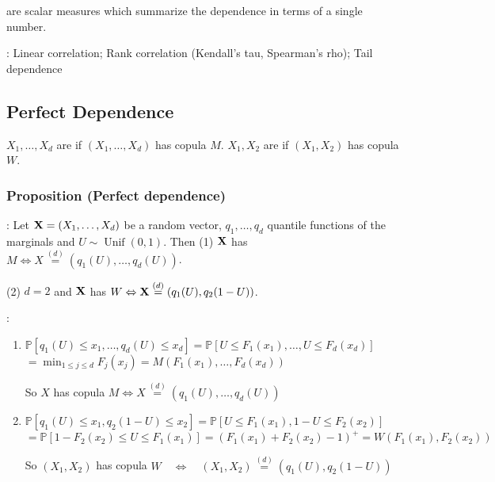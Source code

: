 
 are scalar measures which summarize the dependence in terms of a single number.

: Linear correlation; Rank correlation (Kendall’s tau, Spearman’s rho); Tail dependence


\subsection*{Perfect Dependence}
$X_{1}, \ldots, X_{d}$ are  if $\left(X_{1}, \ldots, X_{d}\right)$ has copula $M$. $X_{1}, X_{2}$ are  if $\left(X_{1}, X_{2}\right)$ has copula $W$.

\subsubsection*{Proposition (Perfect dependence)}: Let $\operatorname{\boldsymbol{\mathbf{X}}}=\left(X_{1}, \ldots, X_{d}\right)$ be a random vector, $q_{1}, \ldots, q_{d}$ quantile functions of the marginals and $U \sim \operatorname{Unif}(0,1)$. Then
(1) $\operatorname{\boldsymbol{\mathbf{X}}}$ has  $M \Leftrightarrow X \stackrel{(d)}{=}\left(q_{1}(U), \ldots, q_{d}(U)\right)$.


(2) $d=2$ and $\operatorname{\boldsymbol{\mathbf{X}}}$ has  $W \Leftrightarrow \operatorname{\boldsymbol{\mathbf{X}}} \stackrel{(d)}{=}\left(q_{1}(U), q_{2}(1-U)\right)$.

: 
\begin{enumerate}[label = (\arabic*), leftmargin=*]
    \item $\mathbb{P}\left[q_{1}(U) \leq x_{1}, \ldots, q_{d}(U) \leq x_{d}\right]=\mathbb{P}\left[U \leq F_{1}\left(x_{1}\right), \ldots, U \leq F_{d}\left(x_{d}\right)\right]$
$=\min _{1 \leq j \leq d} F_{j}\left(x_{j}\right)=M\left(F_{1}\left(x_{1}\right), \ldots, F_{d}\left(x_{d}\right)\right)$

So $X$ has copula $M \Leftrightarrow X \stackrel{(d)}{=}\left(q_{1}(U), \ldots, q_{d}(U)\right)$
    \item $\mathbb{P}\left[q_{1}(U) \leq x_{1}, q_{2}(1-U) \leq x_{2}\right]=\mathbb{P}\left[U \leq F_{1}\left(x_{1}\right), 1-U \leq F_{2}\left(x_{2}\right)\right]$
$=\mathbb{P}\left[1-F_{2}\left(x_{2}\right) \leq U \leq F_{1}\left(x_{1}\right)\right]=\left(F_{1}\left(x_{1}\right)+F_{2}\left(x_{2}\right)-1\right)^{+}=W\left(F_{1}\left(x_{1}\right), F_{2}\left(x_{2}\right)\right)$

So $\left(X_{1}, X_{2}\right)$ has copula $W \quad \Leftrightarrow \quad\left(X_{1}, X_{2}\right) \stackrel{(d)}{=}\left(q_{1}(U), q_{2}(1-U)\right)$
\end{enumerate}






